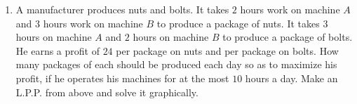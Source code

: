 \begin{enumerate}
\item A manufacturer produces nuts and bolts. It takes $2$ hours work on machine $A$ and $3$ hours work on machine $B$ to produce a package of nuts. It takes $3$ hours on machine $A$ and $2$ hours on machine $B$ to produce a package of bolts. He earns a profit of \rupee $24$ per package on nuts and  per package on bolts. How many packages of each should be produced each day so as to maximize his profit, if he operates his machines for at the most $10$ hours a day. Make an L.P.P. from above and solve it graphically.
\end{enumerate}
